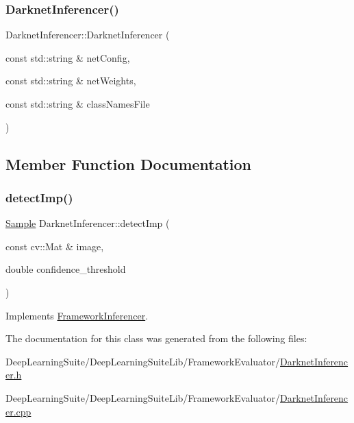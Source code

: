 \subsubsection{\texorpdfstring{Darknet\+Inferencer()}{DarknetInferencer()}}
{\footnotesize\ttfamily Darknet\+Inferencer\+::\+Darknet\+Inferencer (\begin{DoxyParamCaption}\item[{const std\+::string \&}]{net\+Config,  }\item[{const std\+::string \&}]{net\+Weights,  }\item[{const std\+::string \&}]{class\+Names\+File }\end{DoxyParamCaption})}



\subsection{Member Function Documentation}
\mbox{\label{class_darknet_inferencer_a9fb53792b71055b3104e5a54a6190c50}} 
\subsubsection{\texorpdfstring{detect\+Imp()}{detectImp()}}
{\footnotesize\ttfamily \hyperlink{struct_sample}{Sample} Darknet\+Inferencer\+::detect\+Imp (\begin{DoxyParamCaption}\item[{const cv\+::\+Mat \&}]{image,  }\item[{double}]{confidence\+\_\+threshold }\end{DoxyParamCaption})\hspace{0.3cm}{\ttfamily [virtual]}}



Implements \hyperlink{class_framework_inferencer_a8fd7e708c8be4471bc2b37a4193a9045}{Framework\+Inferencer}.



The documentation for this class was generated from the following files\+:\begin{DoxyCompactItemize}
\item 
Deep\+Learning\+Suite/\+Deep\+Learning\+Suite\+Lib/\+Framework\+Evaluator/\hyperlink{_darknet_inferencer_8h}{Darknet\+Inferencer.\+h}\item 
Deep\+Learning\+Suite/\+Deep\+Learning\+Suite\+Lib/\+Framework\+Evaluator/\hyperlink{_darknet_inferencer_8cpp}{Darknet\+Inferencer.\+cpp}\end{DoxyCompactItemize}
